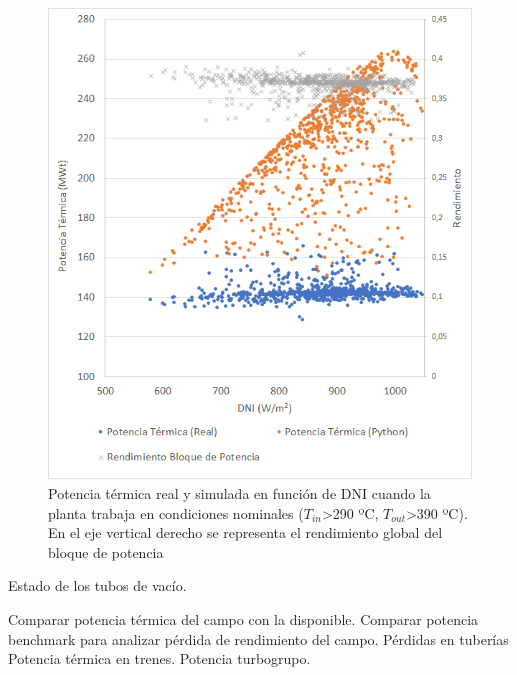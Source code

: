 \begin{figure}[h!]
\includegraphics[width=0.9\linewidth]{images/potencia_dni_aste1b.png}
\caption{Potencia térmica real y simulada en función de DNI cuando la planta trabaja en condiciones nominales ($T_{in}$>290 ºC, $T_{out}$>390 ºC). En el eje vertical derecho se representa el rendimiento global del bloque de potencia} 
\label{fig:potenica_dni}
\end{figure}

Estado de los tubos de vacío. 

Comparar potencia térmica del campo con la disponible.
Comparar potencia benchmark para analizar pérdida de rendimiento del campo.
Pérdidas en tuberías
Potencia térmica en trenes.
Potencia turbogrupo.



 

